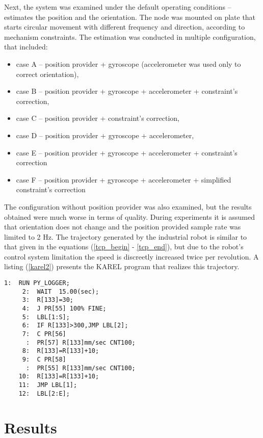  Next, the system was examined under the default operating conditions -- estimates the position and the orientation. The node was mounted on plate that starts circular movement with different frequency and direction, according to mechanism constraints. The estimation was conducted in multiple configuration, that included:
\begin{itemize}
	\item case A -- position provider + gyroscope (accelerometer was used only to correct orientation),
	\item case B -- position provider + gyroscope + accelerometer + constraint's correction,
	\item case C -- position provider + constraint's correction,
	\item case D -- position provider + gyroscope + accelerometer,
	\item case E -- position provider + gyroscope + accelerometer + constraint's correction
	\item case F -- position provider + gyroscope + accelerometer + simplified constraint's correction
\end{itemize}

The configuration without position provider was also examined, but the results obtained were much worse in terms of quality. During experiments it is assumed that orientation does not change and the position provided sample rate was limited to 2 Hz. The trajectory generated by the industrial robot is similar to that given in the equations (\ref{tcp_begin} - \ref{tcp_end}), but due to the robot's control system limitation the speed is discreetly increased twice per revolution. A listing (\ref{karel2}) presents the KAREL program that realizes this trajectory.

\begin{lstlisting}[caption={The KAREL program realizing a circular motion}, captionpos=t, label=karel2]
 	 1:  RUN PY_LOGGER;
	 2:  WAIT  15.00(sec);
	 3:  R[133]=30;
 	 4:  J PR[55] 100% FINE;
	 5:  LBL[1:S];
	 6:  IF R[133]>300,JMP LBL[2];
 	 7:  C PR[56]    
	  :  PR[57] R[133]mm/sec CNT100;
	 8:  R[133]=R[133]+10;
	 9:  C PR[58]    
	  :  PR[55] R[133]mm/sec CNT100;
	10:  R[133]=R[133]+10;
	11:  JMP LBL[1];
	12:  LBL[2:E];
\end{lstlisting}

\section{Results}

